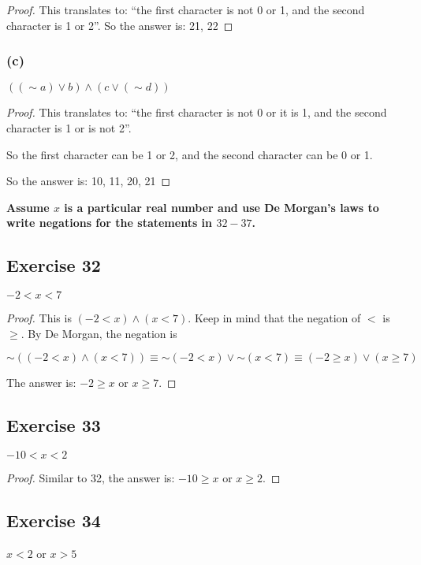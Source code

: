 \documentclass[14pt]{extarticle}
\begin{document}
\begin{proof}
    This translates to: ``the first character is not 0 or 1, and the second character is 1 or 2''. So the answer is: 21, 22
\end{proof}

\subsubsection{(c)}
$(({\sim a}) \vee b) \wedge (c \vee ({\sim d}))$

\begin{proof}
    This translates to: ``the first character is not 0 or it is 1, and the second character is 1 or is not 2''.

    So the first character can be 1 or 2, and the second character can be 0 or 1.

    So the answer is: 10, 11, 20, 21
\end{proof}

{\bf Assume $x$ is a particular real number and use De Morgan’s laws to write negations for the statements in $32-37$.}

\subsection{Exercise 32}
$-2 < x < 7$

\begin{proof}
    This is $(-2 < x) \wedge (x < 7)$. Keep in mind that the negation of $<$ is $\geq$. By De Morgan, the negation is

    $\sim((-2 < x) \wedge (x < 7)) \equiv {\sim(-2 < x)} \vee {\sim(x < 7)} \equiv (-2 \geq x) \vee (x \geq 7)$

    The answer is: $-2 \geq x$ or $x \geq 7$.
\end{proof}

\subsection{Exercise 33}
$-10 < x < 2$

\begin{proof}
    Similar to 32, the answer is: $-10 \geq x$ or $x \geq 2$.
\end{proof}

\subsection{Exercise 34}
$x < 2$ or $x > 5$
\end{document}
